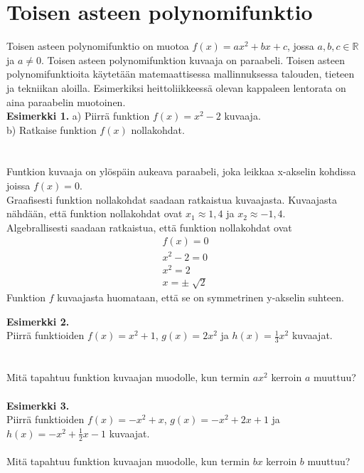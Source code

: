 \chapter{Toisen asteen polynomifunktio}
Toisen asteen polynomifunktio on muotoa $f(x)=ax^2+bx+c$, jossa $a,b,c \in \mathbb{R}$ ja $a \neq 0$. Toisen asteen polynomifunktion kuvaaja on paraabeli. Toisen asteen polynomifunktioita käytetään matemaattisessa mallinnuksessa talouden, tieteen ja tekniikan aloilla. Esimerkiksi heittoliikkeessä olevan kappaleen lentorata on aina paraabelin muotoinen. \\
\textbf{Esimerkki 1.}
a) Piirrä funktion $f(x)=x^2-2$ kuvaaja. \\ 
b) Ratkaise funktion $f(x)$ nollakohdat. \\ \\
\missingfigure \\
Funtkion kuvaaja on ylöspäin aukeava paraabeli, joka leikkaa x-akselin kohdissa joissa $f(x)=0$. \\
Graafisesti funktion nollakohdat saadaan ratkaistua kuvaajasta. Kuvaajasta nähdään, että funktion nollakohdat ovat $x_1 \approx 1,4$ ja $x_2 \approx -1,4$. \\
Algebrallisesti saadaan ratkaistua, että funktion nollakohdat ovat 
\begin{align*}
f(x)=0 \\
x^2-2=0 \\
x^2=2 \\
x= \pm \sqrt[]{2}
\end{align*}
Funktion $f$ kuvaajasta huomataan, että se on symmetrinen y-akselin suhteen. 

\textbf{Esimerkki 2.} \\
Piirrä funktioiden $f(x)=x^2+1$, $g(x)=2x^2$ ja $h(x)=\frac{1}{3}x^2$ kuvaajat. \\ \\
\missingfigure \\
Mitä tapahtuu funktion kuvaajan muodolle, kun termin $ax^2$ kerroin $a$ muuttuu? \\ \\

\textbf{Esimerkki 3.} \\
Piirrä funktioiden $f(x)=-x^2+x$, $g(x)=-x^2+2x+1$ ja $h(x)=-x^2+\frac{1}{2}x-1$ kuvaajat. \\
\missingfigure \\
Mitä tapahtuu funktion kuvaajan muodolle, kun termin $bx$ kerroin $b$ muuttuu? \\ \\

